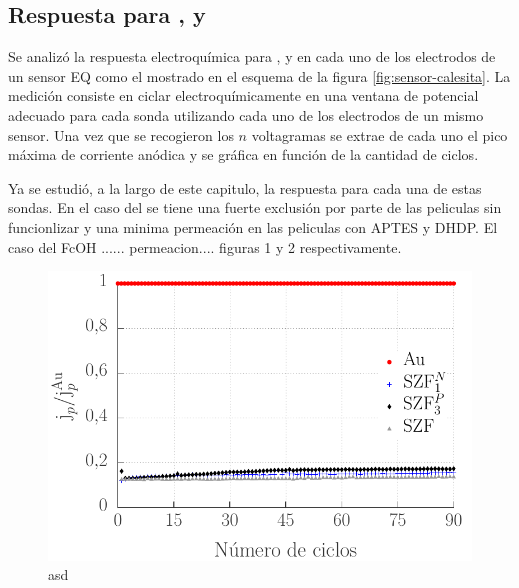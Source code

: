 {	\subsection{Respuesta para \ru, \fe\space y \fc}	

		Se analizó la respuesta electroquímica para \aminorutenio, \ferroferri\space y \ferroceno en cada uno de los electrodos de un sensor EQ como el mostrado en el esquema de la figura \ref{fig:sensor-calesita}. La medición consiste en ciclar electroquímicamente en una ventana de potencial adecuado para cada sonda utilizando cada uno de los electrodos de un mismo sensor. Una vez que se recogieron los $n$ voltagramas se extrae de cada uno el  pico máxima de corriente anódica y se gráfica en función de la cantidad de ciclos. 

		Ya se estudió, a la largo de este capitulo, la respuesta para cada una de estas sondas. En el caso del \fe\space se tiene una fuerte exclusión por parte de las peliculas sin funcionlizar y una minima permeación en las peliculas con APTES y DHDP. El caso del FcOH ...... permeacion.... figuras 1 y 2 respectivamente.

		\begin{figure}[ht!]
		 	       	\begin{center}
		 	       	\includegraphics[width=\textwidth]{Graficos/ciclosintferroceno.pdf}
		        	\caption[asd]{asd}
		         	\end{center}
		     		\end{figure}

}
